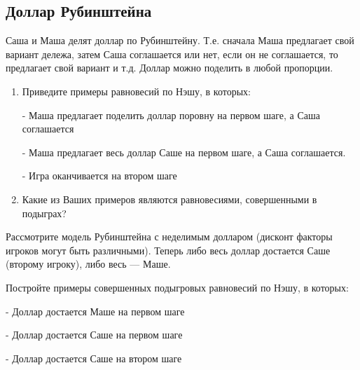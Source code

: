\subsection{Доллар Рубинштейна}

\begin{problem}
Саша и Маша делят доллар по Рубинштейну. Т.е. сначала Маша предлагает свой вариант дележа, затем Саша соглашается или нет, если он не соглашается, то предлагает свой вариант и т.д. Доллар можно поделить в любой пропорции.\par

\begin{enumerate}
\item  Приведите примеры равновесий по Нэшу, в которых:\par
- Маша предлагает поделить доллар поровну на первом шаге, а Саша соглашается\par
- Маша предлагает весь доллар Саше на первом шаге, а Саша соглашается.\par
- Игра оканчивается на втором шаге\par
\item Какие из Ваших примеров являются равновесиями, совершенными в подыграх?
\end{enumerate}


\begin{sol}

\end{sol}
\end{problem}



\begin{problem}\par
\begin{source} \cite{binmore:fg} \end{source}
Рассмотрите модель Рубинштейна с неделимым долларом (дисконт факторы игроков могут быть различными). Теперь либо весь доллар достается Саше (второму игроку), либо весь --- Маше.\par
 Постройте примеры совершенных подыгровых равновесий по Нэшу, в которых:\par
- Доллар достается Маше на первом шаге\par
- Доллар достается Саше на первом шаге\par
- Доллар достается Саше на втором шаге\par



\begin{sol}

\end{sol}
\end{problem}



